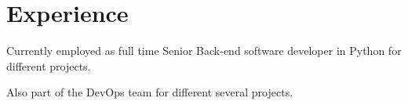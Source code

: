 \documentclass[]{plushcv}
\begin{document}





\section{Experience}

\begin{tightemize}
\item Currently employed as full time Senior Back-end software developer in Python for different projects. 
\item Also part of the DevOps team for different several projects.
\end{tightemize}
\end{document}
